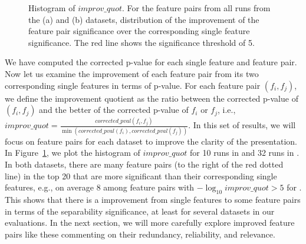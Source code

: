 \begin{figure}[h]
\centering %
\vspace{-3mm}
\vspace{-5mm}
\caption{Histogram of $improv\_quot$. For the \toptwenty feature pairs from all runs from the (a) \msig and (b) \lincs datasets, distribution of the improvement of the feature pair significance over the corresponding single feature significance. The red line shows the significance threshold of 5.}
\vspace{-5mm}
\label{fig:histogram_diff}
\end{figure}


 We have computed the corrected p-value for each single feature and feature pair. Now let us examine the improvement of each feature pair from its two corresponding single features in terms of p-value. For each feature pair $(f_i,f_j)$, we define the improvement quotient  as the ratio between the corrected p-value of $(f_i,f_j)$ and the better of the corrected p-value of $f_i$ or $f_j$, i.e., $improv\_quot = \frac{corrected\_pval(f_i,f_j)}{\min(corrected\_pval(f_i),corrected\_pval(f_j))}$. In this set of results, we will focus on \toptwenty feature pairs for each dataset to improve the clarity of the presentation. In Figure~\ref{fig:histogram_diff}, we plot the histogram of $improv\_quot$ for 10 runs in \msig and 32 runs in \lincs. In both datasets, there are many feature pairs (to the right of the red dotted line) in the top 20 that are more significant than their corresponding single features, e.g., on average 8 among \toptwenty feature pairs with $-\log_{10} improv\_quot > 5$ for \lincs. This shows that there is a improvement from single features to some feature pairs in terms of the separability significance, at least for several datasets in our evaluations. In the next section, we will more carefully explore improved feature pairs like these commenting on their redundancy, reliability, and relevance. 


